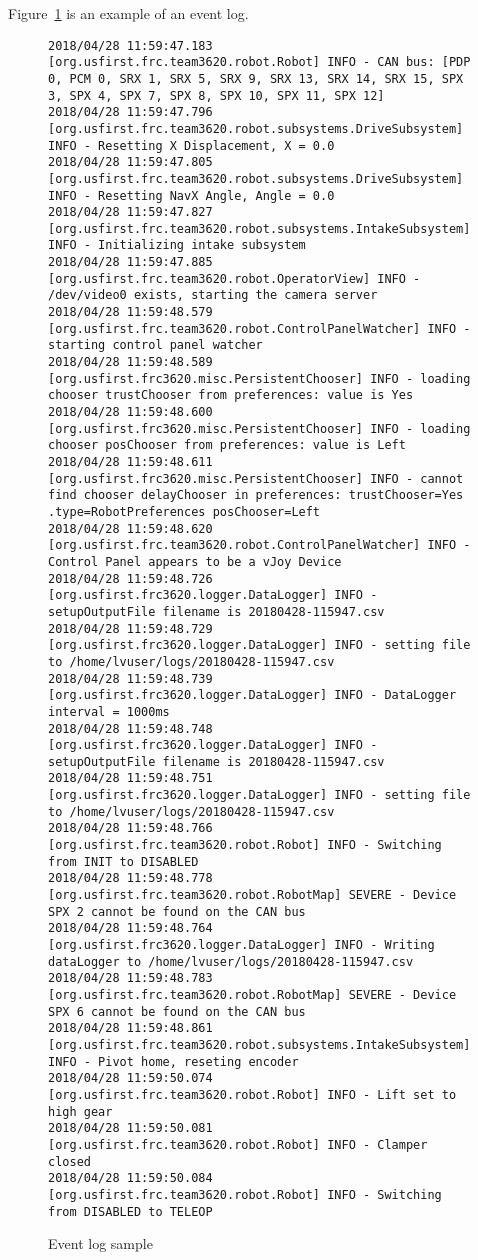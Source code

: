 \documentclass[]{article}
\begin{document}
\begin{itemize}[topsep=0pt]
Figure~\ref{fig:eventlog} is an example of an event log.
\begin{figure}[h]
\begin{mdframed}
\begin{lstlisting}[basicstyle=\ttfamily\tiny]
2018/04/28 11:59:47.183 [org.usfirst.frc.team3620.robot.Robot] INFO - CAN bus: [PDP 0, PCM 0, SRX 1, SRX 5, SRX 9, SRX 13, SRX 14, SRX 15, SPX 3, SPX 4, SPX 7, SPX 8, SPX 10, SPX 11, SPX 12]
2018/04/28 11:59:47.796 [org.usfirst.frc.team3620.robot.subsystems.DriveSubsystem] INFO - Resetting X Displacement, X = 0.0
2018/04/28 11:59:47.805 [org.usfirst.frc.team3620.robot.subsystems.DriveSubsystem] INFO - Resetting NavX Angle, Angle = 0.0
2018/04/28 11:59:47.827 [org.usfirst.frc.team3620.robot.subsystems.IntakeSubsystem] INFO - Initializing intake subsystem
2018/04/28 11:59:47.885 [org.usfirst.frc.team3620.robot.OperatorView] INFO - /dev/video0 exists, starting the camera server
2018/04/28 11:59:48.579 [org.usfirst.frc.team3620.robot.ControlPanelWatcher] INFO - starting control panel watcher
2018/04/28 11:59:48.589 [org.usfirst.frc3620.misc.PersistentChooser] INFO - loading chooser trustChooser from preferences: value is Yes
2018/04/28 11:59:48.600 [org.usfirst.frc3620.misc.PersistentChooser] INFO - loading chooser posChooser from preferences: value is Left
2018/04/28 11:59:48.611 [org.usfirst.frc3620.misc.PersistentChooser] INFO - cannot find chooser delayChooser in preferences: trustChooser=Yes .type=RobotPreferences posChooser=Left 
2018/04/28 11:59:48.620 [org.usfirst.frc.team3620.robot.ControlPanelWatcher] INFO - Control Panel appears to be a vJoy Device
2018/04/28 11:59:48.726 [org.usfirst.frc3620.logger.DataLogger] INFO - setupOutputFile filename is 20180428-115947.csv
2018/04/28 11:59:48.729 [org.usfirst.frc3620.logger.DataLogger] INFO - setting file to /home/lvuser/logs/20180428-115947.csv
2018/04/28 11:59:48.739 [org.usfirst.frc3620.logger.DataLogger] INFO - DataLogger interval = 1000ms
2018/04/28 11:59:48.748 [org.usfirst.frc3620.logger.DataLogger] INFO - setupOutputFile filename is 20180428-115947.csv
2018/04/28 11:59:48.751 [org.usfirst.frc3620.logger.DataLogger] INFO - setting file to /home/lvuser/logs/20180428-115947.csv
2018/04/28 11:59:48.766 [org.usfirst.frc.team3620.robot.Robot] INFO - Switching from INIT to DISABLED
2018/04/28 11:59:48.778 [org.usfirst.frc.team3620.robot.RobotMap] SEVERE - Device SPX 2 cannot be found on the CAN bus
2018/04/28 11:59:48.764 [org.usfirst.frc3620.logger.DataLogger] INFO - Writing dataLogger to /home/lvuser/logs/20180428-115947.csv
2018/04/28 11:59:48.783 [org.usfirst.frc.team3620.robot.RobotMap] SEVERE - Device SPX 6 cannot be found on the CAN bus
2018/04/28 11:59:48.861 [org.usfirst.frc.team3620.robot.subsystems.IntakeSubsystem] INFO - Pivot home, reseting encoder
2018/04/28 11:59:50.074 [org.usfirst.frc.team3620.robot.Robot] INFO - Lift set to high gear
2018/04/28 11:59:50.081 [org.usfirst.frc.team3620.robot.Robot] INFO - Clamper closed
2018/04/28 11:59:50.084 [org.usfirst.frc.team3620.robot.Robot] INFO - Switching from DISABLED to TELEOP
\end{lstlisting}
\caption{Event log sample}
\label{fig:eventlog}
\end{mdframed}
\end{figure}


\end{itemize}
\end{document}

